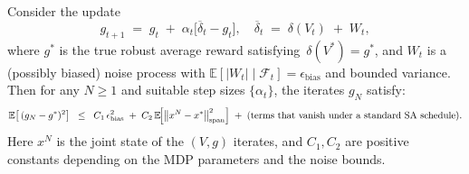 \begin{theorem}
\label{thm:avg-reward-bound}
Consider the update
\[
  g_{t+1}
  \;=\;
  g_t
  \;+\;
  \alpha_t\bigl[\overline{\delta}_t - g_t\bigr],
  \quad
  \overline{\delta}_t
  \;=\;
  \delta(V_t)
  \;+\;
  W_t,
\]
where $g^*$ is the true robust average reward satisfying
\(\,\delta(V^*)=g^*\), and $W_t$ is a (possibly biased) noise process with
\(\mathbb{E}[|W_t|\mid \mathcal{F}_t]=\epsilon_{\mathrm{bias}}\) and bounded variance.
Then for any $N\ge1$ and suitable step sizes $\{\alpha_t\}$, the iterates $g_N$ satisfy:
\[
  \mathbb{E}\bigl[\,(g_N - g^*)^2\bigr]
  \;\;\le\;\;
  C_1\,\epsilon_{\mathrm{bias}}^2
  \;+\;
  C_2\,\mathbb{E}\!\Bigl[\bigl\|x^N - x^*\bigr\|_{\mathrm{span}}^2\Bigr]
  \;+\;
  \text{(terms that vanish under a standard SA schedule).}
\]
Here $x^N$ is the joint state of the $(V,g)$ iterates, and $C_1,C_2$ are positive constants
depending on the MDP parameters and the noise bounds.
\end{theorem}

